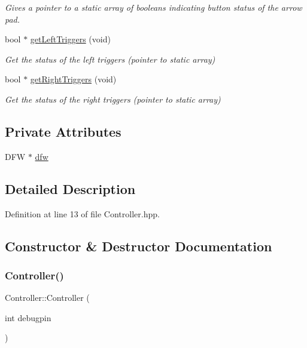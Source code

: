 \begin{DoxyCompactItemize}
\begin{DoxyCompactList}\small\item\em Gives a pointer to a static array of booleans indicating button status of the arrow pad. \end{DoxyCompactList}\item 
bool $\ast$ \hyperlink{class_controller_ab365e97c2d57559a84acda2794c46b01}{get\+Left\+Triggers} (void)
\begin{DoxyCompactList}\small\item\em Get the status of the left triggers (pointer to static array) \end{DoxyCompactList}\item 
bool $\ast$ \hyperlink{class_controller_afb7906afd8ea451e1f78e337bd22d95b}{get\+Right\+Triggers} (void)
\begin{DoxyCompactList}\small\item\em Get the status of the right triggers (pointer to static array) \end{DoxyCompactList}\end{DoxyCompactItemize}
\subsection*{Private Attributes}
\begin{DoxyCompactItemize}
\item 
D\+FW $\ast$ \hyperlink{class_controller_af4793ccbf2ecdbfcdb9359bd32b6e8cf}{dfw}
\end{DoxyCompactItemize}


\subsection{Detailed Description}


Definition at line 13 of file Controller.\+hpp.



\subsection{Constructor \& Destructor Documentation}
\mbox{\label{class_controller_aab64b54728b3f5d68bd2320605bdc51d}} 
\subsubsection{\texorpdfstring{Controller()}{Controller()}}
{\footnotesize\ttfamily Controller\+::\+Controller (\begin{DoxyParamCaption}\item[{int}]{debugpin }\end{DoxyParamCaption})}



